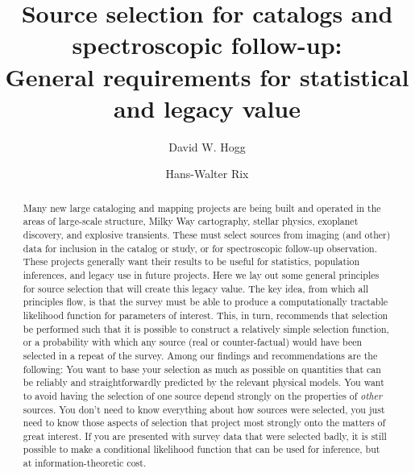 \documentclass[modern]{aastex62}
\begin{document}
\sloppy\sloppypar\raggedbottom\frenchspacing %

\title{\textbf{%
Source selection for catalogs and spectroscopic follow-up:\\
General requirements for statistical and legacy value%
}}

\author[0000-0003-2866-9403]{David W. Hogg}

\author[0000-0003-4996-9069]{Hans-Walter Rix}

\begin{abstract}\noindent
Many new large cataloging and mapping projects are being built and operated
in the areas of
large-scale structure, Milky Way cartography, stellar physics,
exoplanet discovery, and explosive transients.
These must select sources from imaging (and other) data for inclusion
in the catalog or study, or for spectroscopic follow-up observation.
These projects generally want their results to be useful for
statistics, population inferences, and legacy use in future projects.
Here we lay out some general principles for source selection that will
create this legacy value.
The key idea, from which all principles flow, is that the survey must
be able to produce a computationally tractable
likelihood function for parameters of interest.
This, in turn, recommends that selection be performed such that it is possible
to construct a relatively simple selection function, or a probability
with which any source (real or counter-factual) would have been selected
in a repeat of the survey.
Among our findings and recommendations are the following:
You want to base your selection as much as possible on quantities that
can be reliably and straightforwardly predicted by the relevant
physical models.
You want to avoid having the selection of one source
depend strongly on the properties of \emph{other} sources.
You don't need to know everything about how sources were selected, you
just need to know those aspects of selection that project most strongly
onto the matters of great interest.
If you are presented with survey data that were selected badly,
it is still possible to make a conditional likelihood function that can be
used for inference, but at information-theoretic cost.
\end{abstract}
\end{document}
